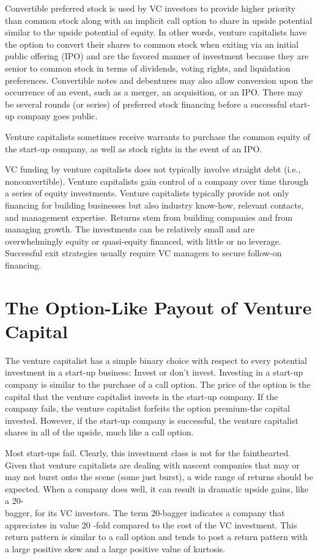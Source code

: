 \documentclass[11pt]{article}
\begin{document}
Convertible preferred stock is used by VC investors to provide higher priority than common stock along with an implicit call option to share in upside potential similar to the upside potential of equity. In other words, venture capitalists have the option to convert their shares to common stock when exiting via an initial public offering (IPO) and are the favored manner of investment because they are senior to common stock in terms of dividends, voting rights, and liquidation preferences. Convertible notes and debentures may also allow conversion upon the occurrence of an event, such as a merger, an acquisition, or an IPO. There may be several rounds (or series) of preferred stock financing before a successful start-up company goes public.

Venture capitalists sometimes receive warrants to purchase the common equity of the start-up company, as well as stock rights in the event of an IPO.

VC funding by venture capitalists does not typically involve straight debt (i.e., nonconvertible). Venture capitalists gain control of a company over time through a series of equity investments. Venture capitalists typically provide not only financing for building businesses but also industry know-how, relevant contacts, and management expertise. Returns stem from building companies and from managing growth. The investments can be relatively small and are overwhelmingly equity or quasi-equity financed, with little or no leverage. Successful exit strategies usually require VC managers to secure follow-on financing.

\section*{The Option-Like Payout of Venture Capital}
The venture capitalist has a simple binary choice with respect to every potential investment in a start-up business: Invest or don't invest. Investing in a start-up company is similar to the purchase of a call option. The price of the option is the capital that the venture capitalist invests in the start-up company. If the company fails, the venture capitalist forfeits the option premium-the capital invested. However, if the start-up company is successful, the venture capitalist shares in all of the upside, much like a call option.

Most start-ups fail. Clearly, this investment class is not for the fainthearted. Given that venture capitalists are dealing with nascent companies that may or may not burst onto the scene (some just burst), a wide range of returns should be expected. When a company does well, it can result in dramatic upside gains, like a 20-\\
bagger, for its VC investors. The term 20-bagger indicates a company that appreciates in value 20 -fold compared to the cost of the VC investment. This return pattern is similar to a call option and tends to post a return pattern with a large positive skew and a large positive value of kurtosis.
\end{document}
